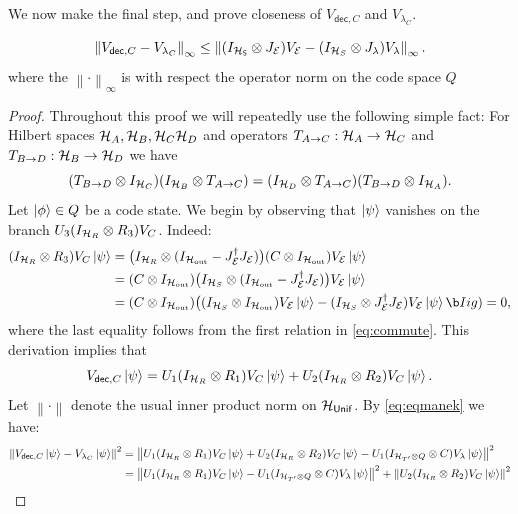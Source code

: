 \documentclass[10pt]{article}
\newcommand{\SOUT}{\mathrm{out}}
\newcommand{\norm}[1]{\left\|#1\right\|}
\newcommand{\s}[1]{\mathsf{#1}}
\begin{document}
    We now make the final step, and prove closeness of $V_{\s{dec},C}$ and $V_{\lambda_C}$. 
    \begin{lemma}
        \[\norm{V_{\s{dec},C}-V_{\lambda_C}}_{\infty}\leq \norm{(I_{\s{\calH_{S}}}\otimes J_{\calE})V_{\calE}-(I_{\calH_S}\otimes J_{\lambda})V_{\lambda}}_{\infty}.\]
        where the $\norm{\cdot}_{\infty}$ is with respect the operator norm on the code space $Q$
    \end{lemma}
    \begin{proof}
         Throughout this proof we will repeatedly use the following simple fact: For Hilbert spaces ${\cal H}_A,{\cal H}_B,{\cal H}_C{\cal H}_D$ and operators $T_{A\to C}:{\cal H}_{A}\to {\cal H}_{C}$ and $T_{B\to D}:{\cal H}_{B}\to {\cal H}_{D}$ we have 
         \[(T_{B\to D}\otimes I_{{\cal H}_C} )(I_{{\cal H}_B}\otimes T_{A\to C})=(I_{{\cal H}_D}\otimes T_{A\to C})(T_{B\to D}\otimes I_{{\cal H}_A} ).\]
        Let $\ket{\phi}\in Q$ be a code state. We begin by observing that $\ket{\psi}$ vanishes on the branch $U_3(I_{{\cal H}_R}\otimes R_3)V_{C}$. Indeed:
        \begin{align*}
            (I_{\calH_R}\otimes R_3)V_C\ket{\psi}&=\big(I_{\calH_R}\otimes (I_{\calH_{\SOUT}}-J_{\calE}^\dag J_{\calE})\big)(C \otimes I_{\calH_{\SOUT}})V_{\calE}\ket{\psi}\\
            &=(C \otimes I_{\calH_{\SOUT}})\big(I_{\calH_S}\otimes (I_{\calH_{\SOUT}}-J_{\calE}^\dag J_{\calE})\big)V_{\calE}\ket{\psi}
            \\
            &=(C \otimes I_{\calH_{\SOUT}})\big((I_{\calH_S}\otimes I_{\calH_{\SOUT}})V_{\calE}\ket{\psi} -(I_{\calH_S}\otimes J_{\calE}^\dag J_{\calE})V_{\calE}\ket{\psi}\b I ig)=0,
        \end{align*}
        where the last equality follows from the first relation in \eqref{eq:commute}. This derivation implies that
        \begin{equation}
            V_{\s{dec},C}\ket{\psi}=U_1(I_{\calH_R}\otimes R_1)V_{C}\ket{\psi}+U_2(I_{\calH_R}\otimes R_2)V_C\ket{\psi}.\label{eq:eqmanek}
        \end{equation} Let $\norm{\cdot}$ denote the usual inner product norm on $\calH_{\s{Unif}}$. By \eqref{eq:eqmanek} we have:
        \begin{align}
            \norm{V_{\s{dec},C}\ket{\psi}-V_{\lambda_C}\ket{\psi}}^2&\nonumber=\norm{U_1(I_{\calH_R}\otimes R_1)V_{C}\ket{\psi}+U_2(I_{\calH_R}\otimes R_2)V_C\ket{\psi}-U_1(I_{\calH_{T'}\otimes Q}\otimes C) V_{\lambda}\ket{\psi}}^2\\
            &=\norm{U_1(I_{\calH_R}\otimes R_1)V_{C}\ket{\psi}-U_1(I_{\calH_{T'}\otimes Q}\otimes C) V_{\lambda}\ket{\psi}}^2+\norm{U_2(I_{\calH_R}\otimes R_2)V_C\ket{\psi}}^2\label{eq:onOthogonalStates}\\

\end{align}
\end{proof}
\end{document}
